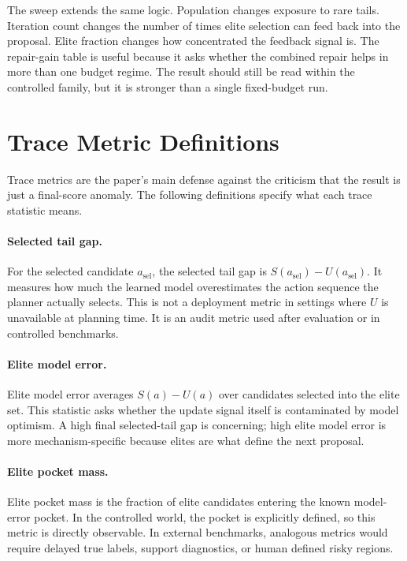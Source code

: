 The sweep extends the same logic. Population changes exposure to rare tails.
Iteration count changes the number of times elite selection can feed back into
the proposal. Elite fraction changes how concentrated the feedback signal is.
The repair-gain table is useful because it asks whether the combined repair
helps in more than one budget regime. The result should still be read within
the controlled family, but it is stronger than a single fixed-budget run.

\section{Trace Metric Definitions}
\label{app:trace-metrics}

Trace metrics are the paper's main defense against the criticism that the
result is just a final-score anomaly. The following definitions specify what
each trace statistic means.

\paragraph{Selected tail gap.}
For the selected candidate $a_{\mathrm{sel}}$, the selected tail gap is
$S(a_{\mathrm{sel}})-U(a_{\mathrm{sel}})$. It measures how much the learned
model overestimates the action sequence the planner actually selects. This is
not a deployment metric in settings where $U$ is unavailable at planning time.
It is an audit metric used after evaluation or in controlled benchmarks.

\paragraph{Elite model error.}
Elite model error averages $S(a)-U(a)$ over candidates selected into the elite
set. This statistic asks whether the update signal itself is contaminated by
model optimism. A high final selected-tail gap is concerning; high elite model
error is more mechanism-specific because elites are what define the next
proposal.

\paragraph{Elite pocket mass.}
Elite pocket mass is the fraction of elite candidates entering the known
model-error pocket. In the controlled world, the pocket is explicitly defined,
so this metric is directly observable. In external benchmarks, analogous
metrics would require delayed true labels, support diagnostics, or human
defined risky regions.

